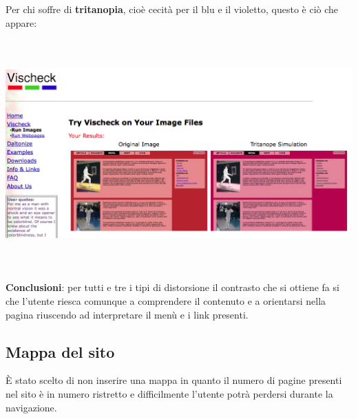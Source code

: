 	\\
	\\ Per chi soffre di \textbf{tritanopia}, cio\`e cecit\`a per il blu e il violetto, questo \`e ci\`o che appare:
	\\
	\\ \includegraphics[width=150mm, height=85mm]{images/contrasto_pagina_tritanope.png}
	\\
	\\ \textbf{Conclusioni}: per tutti e tre i tipi di distorsione il contrasto che si ottiene fa si che l'utente riesca comunque a comprendere il contenuto e a orientarsi nella pagina riuscendo ad interpretare il men\`u e i link presenti.

\subsection{Mappa del sito}
\`E stato scelto di non inserire una mappa in quanto il numero di pagine presenti nel sito \`e in numero ristretto e difficilmente l'utente potr\`a perdersi durante la navigazione.